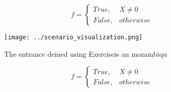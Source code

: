 \documentclass[a4paper]{article}
\begin{document}
\begin{equation}   f =
\begin{cases} True, & X \neq 0\\
False, & otherwise
\end{cases}
\end{equation}

\begin{figure}
\centering
\texttt{[image: ../scenario\_visualization.png]}
\caption{The entrance deined using Exerciseis an mozambiqu
}
\end{figure}
 
\begin{equation}   f =
\begin{cases} True, & X \neq 0\\
False, & otherwise
\end{cases}
\end{equation}
\end{document}
